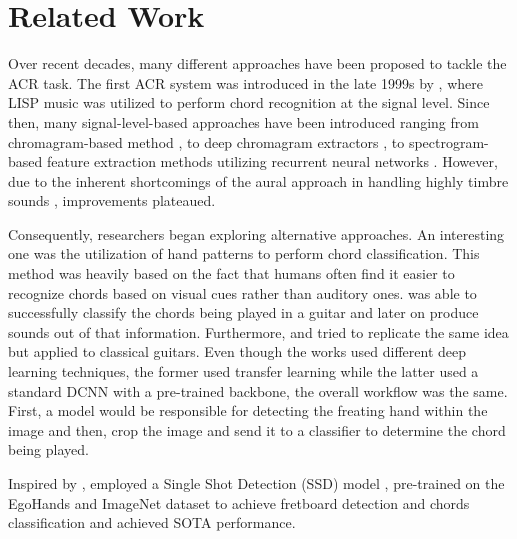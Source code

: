 \documentclass[10pt,twocolumn,letterpaper]{article}
\begin{document}
\section{Related Work}  
Over recent decades, many different approaches have been proposed to tackle the ACR task. The first ACR system was introduced in the late 1999s by \cite{takuya1999realtime}, where LISP music was utilized to perform chord recognition at the signal level. Since then, many signal-level-based approaches have been introduced ranging from chromagram-based method \cite{stark2009real}, to deep chromagram extractors \cite{korzeniowski2016feature}, to spectrogram-based feature extraction methods utilizing recurrent neural networks \cite{boulanger2013audio}. However, due to the inherent shortcomings of the aural approach in handling highly timbre sounds \cite{du2023conditional}, improvements plateaued. 

Consequently, researchers began exploring alternative approaches. An interesting one was the utilization of hand patterns to perform chord classification. This method was heavily based on the fact  that humans often find it easier to recognize chords based on visual cues rather than auditory ones. \cite{su2020audeo} was able to successfully classify the chords being played in a guitar and later on produce sounds out of that information. Furthermore, \cite{tran2019cnn} and \cite{ooaku2018guitar} tried to replicate the same idea but applied to classical guitars. Even though the works used different deep learning techniques, the former used transfer learning while the latter used a standard DCNN with a pre-trained backbone, the overall workflow was the same. First, a model would be responsible for detecting the freating hand within the image and then, crop the image and send it to a classifier to determine the chord being played.

Inspired by \cite{tran2019cnn, ooaku2018guitar}, \cite{Kristian_Zaman_Tenoyo_Jodhinata_2024} employed a Single Shot Detection (SSD) model \cite{sandler2018mobilenetv2}, pre-trained on the EgoHands \cite{Bambach_2015_ICCV} and ImageNet \cite{deng2009imagenet} dataset to achieve fretboard detection and chords classification and achieved SOTA performance.

\end{document}
